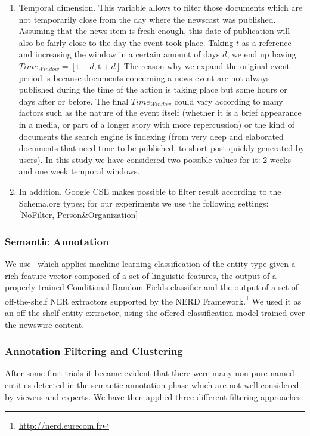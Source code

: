 \documentclass{llncs}
\begin{document}
\begin{enumerate}
 \item Temporal dimension. This variable allows to filter those documents which are not temporarily close from the day where the newscast was published. Assuming that the news item is fresh enough, this date of publication will also be fairly close to the day the event  took place. Taking $t$ as a reference and increasing the window in a certain amount of days $d$, we end up having $Time_{Window}=\left [ \text{t}-d, \text{t}+d \right ]$ The reason why we expand the original event period is because documents concerning a news event are not always published during the time of the action is taking place but some hours or days after or before. The final $Time_{Window}$ could vary according to many factors such as the nature of the event itself (whether it is a brief appearance in a media, or part of a longer story with more repercussion) or the kind of documents the search engine is indexing (from very deep and elaborated documents that need time to be published, to short post quickly generated by users). In this study we have considered two possible values for it: 2 weeks and one week temporal windows.
 \item In addition, Google CSE makes possible to filter result according to the Schema.org types; for our experiments we use the following settings: [NoFilter, Person\&Organization]
\end{enumerate}


\subsubsection{Semantic Annotation}
\label{sec:settingsFilteringClustering}
We use~\cite{RIZZO:2014} which applies machine learning classification of the entity type given a rich feature vector composed of a set of linguistic features, the output of a properly trained Conditional Random Fields classifier and the output of a set of off-the-shelf NER extractors supported by the NERD Framework.\footnote{\url{http://nerd.eurecom.fr}} We used it as an off-the-shelf entity extractor, using the offered classification model trained over the newswire content.

\subsubsection{Annotation Filtering and Clustering}
\label{sec:settingsFilteringClustering}
After some first trials it became evident that there were many non-pure named entities detected in the semantic annotation phase which are not well considered by viewers and experts. We have then applied three different filtering approaches:
\end{document}

